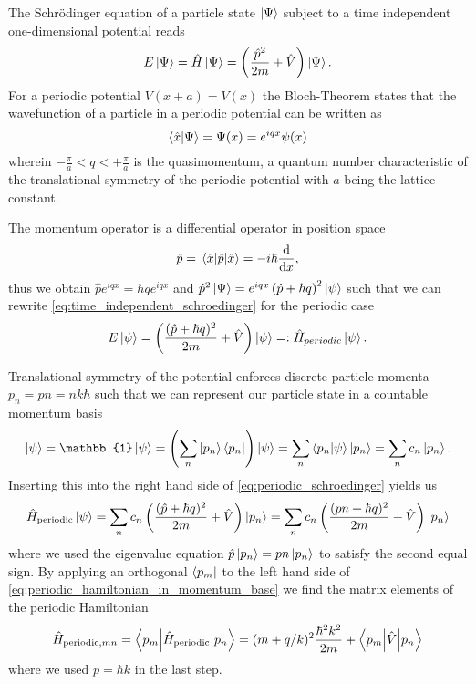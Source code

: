 The Schrödinger equation of a particle state $\ket{\Psi}$ subject to a time
independent one-dimensional potential reads
\begin{align}
  E\ket{\Psi}
  =\hat{H}\ket{\Psi}
  =\left(\frac{\hat{p}^2}{2m}+\hat{V}\right)\ket{\Psi}
  \label{eq:time_independent_schroedinger}.
\end{align}
For a periodic potential $V(x+a)=V(x)$ the Bloch-Theorem \cite{Ashcroft1976}
states that the wavefunction of a particle in a periodic potential can be
written as
\begin{equation}
  \braket{\hat{x}}{\Psi}
  =\Psi(x)
  =e^{iqx}\psi(x)
  \label{eq:bloch_theorem}
\end{equation}
wherein $-\frac{\pi}{a}<q<+\frac{\pi}{a}$ is the quasimomentum, a quantum
number characteristic of the translational symmetry of the periodic potential
\cite[p. 42]{Lewenstein2012} with $a$ being the lattice constant.

The momentum operator is a differential operator in position space
\begin{equation}
  \hat{p}
  =\expval{\hat{p}}{\hat{x}}
  =-i\hbar\dv{x}
  \label{eq:momentum_operator_in_position_space},
\end{equation}
thus we obtain $\hat{p}e^{iqx}=\hbar qe^{iqx}$ and
$\hat{p}^2\ket{\Psi}=e^{iqx}\left(\hat{p}+\hbar q\right)^2\ket{\psi}$ such
that we can rewrite \cref{eq:time_independent_schroedinger} for
the periodic case
\begin{equation}
  E\ket{\psi}
  =\left(\frac{(\hat{p}+\hbar q)^2}{2m}+\hat{V}\right)\ket{\psi}
  =:\hat{H}_{periodic}\ket{\psi}
  \label{eq:periodic_schroedinger}.
\end{equation}

Translational symmetry of the potential enforces discrete particle momenta
$p_n=pn=nk\hbar$ such that we can represent our particle state in a
countable momentum basis
\begin{equation}
  \ket{\psi}
  =\mathbb{1}\ket{\psi}
  =\left(\sum_n\ket{p_n}\bra{p_n}\right)\ket{\psi}
  =\sum_n\braket{p_n}{\psi}\ket{p_n}
  =\sum_nc_n\ket{p_n}
  \label{eq:countable_momentum_state}.
\end{equation}
Inserting this into the right hand side of \cref{eq:periodic_schroedinger}
yields us
\begin{equation}
  \hat{H}_\text{periodic}\ket{\psi}
  =\sum_nc_n\left(\frac{(\hat{p}+\hbar q)^2}{2m}+\hat{V}\right)\ket{p_n}
  =\sum_nc_n\left(\frac{(pn+\hbar q)^2}{2m}+\hat{V}\right)\ket{p_n}
  \label{eq:periodic_hamiltonian_in_momentum_base}
\end{equation}
where we used the eigenvalue equation $\hat{p}\ket{p_n}=pn\ket{p_n}$ to
satisfy the second equal sign. By applying an orthogonal $\bra{p_m}$ to the
left hand side of \cref{eq:periodic_hamiltonian_in_momentum_base} we find
the matrix elements of the periodic Hamiltonian
\begin{equation}
  \hat{H}_{\text{periodic},mn}
  =\mel**{p_m}{\hat{H}_\text{periodic}}{p_n}
  =(m+q/k)^2\frac{\hbar^2k^2}{2m}+\mel**{p_m}{\hat{V}}{p_n}
  \label{eq:periodic_hamiltonian_elements}
\end{equation}
where we used $p=\hbar k$ in the last step.

